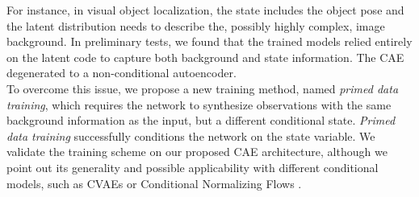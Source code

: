 \documentclass[letterpaper, 10 pt, journal, twoside]{ieeetran}  %
\begin{document}
For instance, in visual object localization, the state includes the object pose and the latent distribution needs to describe the, possibly highly complex, image background.
In preliminary tests, we found that the trained models relied entirely on the latent code to capture both background and state information. The CAE degenerated to a non-conditional autoencoder.\\
To overcome this issue, we propose a new training method, named \textit{primed data training}, which requires the network to synthesize observations with the same background information as the input, but a different conditional state.
\textit{Primed data training} successfully conditions the network on the state variable. We validate the training scheme on our proposed CAE architecture, although we point out its generality and possible applicability with different conditional models, such as CVAEs or Conditional Normalizing Flows \cite{winkler2019learning}.

\end{document}
